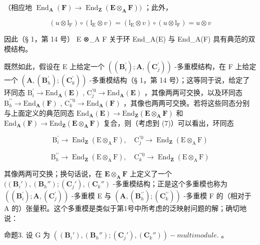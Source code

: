 （相应地 \(\operatorname{End}_{\mathbf{A}}(\mathbf{F}) \to \operatorname{End}_{\mathbf{Z}}(\mathbf{E} \otimes_{\mathbf{A}} \mathbf{F}))\) ；此外，

\[
(u \otimes \mathrm{l} _ {\mathrm{F}}) \circ (\mathrm{l} _ {\mathrm{E}} \otimes v) = (\mathrm{l} _ {\mathrm{E}} \otimes v) \circ (u \otimes \mathrm{l} _ {\mathrm{F}}) = u \otimes v\tag{7}
\]

因此（§ 1，第 14 号） E ⊗\_A F 关于环 End\_A(E) 与 End\_A(F) 具有典范的双模结构。

既然如此，假设在 E 上给定一个 \(((\mathbf{B}_i^{\prime});\mathbf{A},(\mathbf{C}_j^{\prime}))\) -多重模结构，在 F 上给定一个 \((\mathbf{A},(\mathbf{B}_h^{\prime});(\mathbf{C}_k^{\prime}))\) -多重模结构（§ 1，第 14 号）；这等同于说，给定了环同态 \(\mathrm{B}_i^\prime \to \mathrm{End}_{\mathbf{A}}(\mathbf{E})\) , \(\mathrm{C}_j^{\prime 0} \to \mathrm{End}_{\mathbf{A}}(\mathbf{E})\) ，其像两两可交换，以及环同态 \(\mathrm{B}_h^{\prime \prime} \to \mathrm{End}_{\mathbf{A}}(\mathbf{F})\) , \(\mathrm{C}_k^{\prime \prime 0} \to \mathrm{End}_{\mathbf{A}}(\mathbf{F})\) ，其像也两两可交换。若将这些同态分别与上面定义的典范同态 \(\mathrm{End}_{\mathbf{A}}(\mathbf{E}) \to \mathrm{End}_{\mathbf{Z}}(\mathbf{E} \otimes_{\mathbf{A}} \mathbf{F})\) 和 \(\mathrm{End}_{\mathbf{A}}(\mathbf{F}) \to \mathrm{End}_{\mathbf{Z}}(\mathbf{E} \otimes_{\mathbf{A}} \mathbf{F})\) 复合，则（考虑到 (7)）可以看出，环同态

\[
\mathrm{B} _ {i} ^ {\prime} \rightarrow \operatorname{End} _ {\mathbf {Z}} (\mathrm{E} \otimes_ {\mathrm{A}} \mathrm{F}), \quad \mathrm{C} _ {j} ^ {\prime 0} \rightarrow \operatorname{End} _ {\mathbf {Z}} (\mathrm{E} \otimes_ {\mathrm{A}} \mathrm{F})
\]

\[
\mathrm{B} _ {h} ^ {\prime \prime} \rightarrow \operatorname{End} _ {\mathbf {Z}} (\mathrm{E} \otimes_ {\mathrm{A}} \mathrm{F}), \quad \mathrm{C} _ {k} ^ {\prime \prime 0} \rightarrow \operatorname{End} _ {\mathbf {Z}} (\mathrm{E} \otimes_ {\mathrm{A}} \mathrm{F})
\]

其像两两可交换；换句话说，在 \(\mathbf{E} \otimes_{\mathbf{A}} \mathbf{F}\) 上定义了一个 \(((\mathbf{B}_i'), (\mathbf{B}_h''); (\mathbf{C}_j'), (\mathbf{C}_k'')\) -多重模结构；正是这个多重模也称为 \(((\mathbf{B}_i^{\prime});\mathbf{A},(\mathbf{C}_j^{\prime}))\) -多重模 E 与 \((\mathbf{A},(\mathbf{B}_h^{\prime\prime});(\mathbf{C}_k^{\prime\prime}))\) -多重模 F 的（相对于 A 的）张量积。这个多重模是类似于第1号中所考虑的泛映射问题的解；确切地说：

命题3. 设 G 为 \(((\mathbf{B}_i'), (\mathbf{B}_h''); (\mathbf{C}_j'), (\mathbf{C}_k''))-multimodule.\) 。

